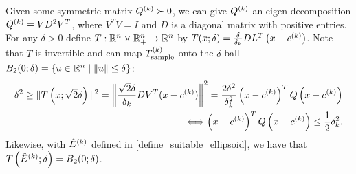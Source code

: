 Given some symmetric matrix ${Q^{(k)}} \succ 0$, we can give ${Q^{(k)}}$ an eigen-decomposition ${Q^{(k)}} = V D^2 V^T$,
where $V^TV = I$ and $D$ is a diagonal matrix with positive entries.
For any
$\delta > 0$ define $T:\mathbb R^n \times \mathbb R^n_+ \rightarrow \mathbb R^n$ by $T(x; \delta) = \frac{\delta}{\delta_k} DL^T\left(x - c^{(k)}\right)$.
Note that $T$ is invertible and can map ${T_{\text{sample}}^{(k)}}$ onto the $\delta$-ball
$B_2(0;\delta) = \left\{u \in \mathbb R^n \; | \; \|u\| \le \delta\right\}$:
\begin{align*}
\delta^2 \ge \|T\left(x; \sqrt{2}\delta\right)\|^2 = \left\|\frac {\sqrt{2}\delta} {\delta_k} DV^T(x - c^{(k)})\right \|^2
= \frac {2\delta^2} {\delta_k^2} \left(x - c^{(k)}\right)^TQ\left(x - c^{(k)}\right) \\
\Longleftrightarrow \left(x - c^{(k)}\right)^TQ\left(x - c^{(k)}\right) \le \frac 1 2 \delta_k^2.
\end{align*}
Likewise, with ${{\hat E}^{(k)}}$ defined in \cref{define_suitable_ellipsoid}, we have that
$T\left({{\hat E}^{(k)}}; \delta\right) = B_2(0; \delta)$.

